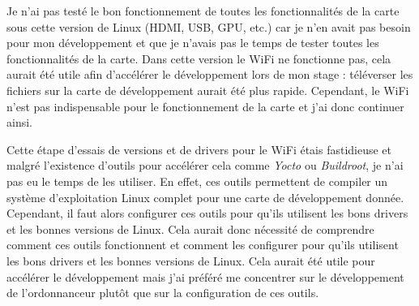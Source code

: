 Je n'ai pas testé le bon fonctionnement de toutes les fonctionnalités de la carte sous cette version de Linux (HDMI, USB, GPU, etc.) car je n'en avait pas besoin pour mon développement et que je n'avais pas le temps de tester toutes les fonctionnalités de la carte. Dans cette version le WiFi ne fonctionne pas, cela aurait été utile afin d'accélérer le développement lors de mon stage : téléverser les fichiers sur la carte de développement aurait été plus rapide. Cependant, le WiFi n'est pas indispensable pour le fonctionnement de la carte et j'ai donc continuer ainsi.

Cette étape d'essais de versions et de drivers pour le WiFi étais fastidieuse et malgré l'existence d'outils pour accélérer cela comme \textit{Yocto} ou \textit{Buildroot}, je n'ai pas eu le temps de les utiliser. En effet, ces outils permettent de compiler un système d'exploitation Linux complet pour une carte de développement donnée. Cependant, il faut alors configurer ces outils pour qu'ils utilisent les bons drivers et les bonnes versions de Linux. Cela aurait donc nécessité de comprendre comment ces outils fonctionnent et comment les configurer pour qu'ils utilisent les bons drivers et les bonnes versions de Linux. Cela aurait été utile pour accélérer le développement mais j'ai préféré me concentrer sur le développement de l'ordonnanceur plutôt que sur la configuration de ces outils.